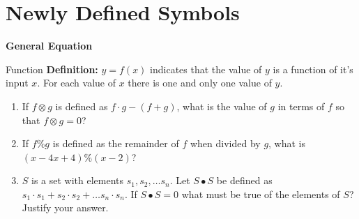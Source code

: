 \section{Newly Defined Symbols}
\bigskip
\textbf{General Equation} 

\bigskip
\begin{equationbox}{Function}
\textbf{Definition:} $y=f(x)$ indicates that the value of $y$ is a function of it's input $x$. For each value of $x$ there is one and only one value of $y$.
\end{equationbox}

\bigskip
\begin{enumerate}[labelindent=*,style=multiline,leftmargin=*,label=\textbf{Example \arabic*:}]
\item If $f\otimes g$ is defined as $f\cdot g-(f+g)$, what is the value of $g$ in terms of $f$ so that $f\otimes g=0$?

\vfill\item If $f\%g$ is defined as the remainder of $f$ when divided by $g$, what is $(x-4x+4)\%(x-2)$?

\vfill\item $S$ is a set with elements $s_1, s_2,\ldots s_n$. Let $S\bullet S$ be defined as $s_1\cdot s_1+s_2\cdot s_2+\ldots s_n\cdot s_n$. If $S\bullet S=0$ what must be true of the elements of $S$? Justify your answer.
\end{enumerate}

